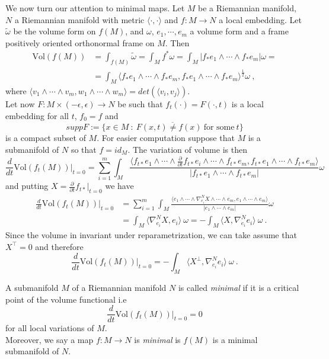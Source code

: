 We now turn our attention to minimal maps.
Let $M$ be a Riemannian manifold, $N$ a Riemannian manifold with metric $\langle \cdot, \cdot \rangle$ and $f:M \to N$ a local embedding. Let $\widetilde{\omega}$ be the volume form on $f(M)$, and $\omega$, $e_1, \cdots , e_m$ a volume form and a frame positively oriented orthonormal frame on $M$. Then
\[
\begin{split}
    \text{Vol}(f(M)) & = \int_{f(M)} \widetilde{\omega} = \int_M f^* \omega  = \int_M | f_* e_1 \wedge \cdots \wedge f_* e_m | \omega = \\
    & = \int_M \langle f_* e_1 \wedge \cdots \wedge f_* e_m ,f_* e_1 \wedge \cdots \wedge f_* e_m \rangle ^{\frac{1}{2}} \omega \ ,
\end{split}
\]
where $\langle v_1 \wedge \cdots \wedge v_m , w_1 \wedge \cdots \wedge w_m \rangle = det(\langle v_i,v_j \rangle)$.\\
Let now $F: M \times (-\epsilon, \epsilon) \to N$ be such that $f_t(\cdot) = F(\cdot,t)$ is a local embedding for all $t$, $f_0 = f$ and
\[ supp F:= \overline{ \{ x\in M \ :\ F(x,t) \neq f(x) \ \text{for some} \ t\} }  \]
is a compact subset of $M$. For easier computation suppose that $M$ is a submanifold of $N$ so that $f = id_M$. The variation of volume is then
\[
    \frac{d}{dt} \text{Vol}(f_t(M)) \Big|_{t=0} = \sum_{i=1}^m \int_M \frac{ \langle f_{t*} e_1 \wedge \cdots \wedge \frac{\partial}{\partial t} f_{t*} e_i \wedge \cdots \wedge f_{t*} e_m ,f_{t*} e_1 \wedge \cdots \wedge f_{t*} e_m \rangle }{| f_{t*} e_1 \wedge \cdots \wedge f_{t*} e_m |} \omega
\]
and putting $X =\frac{\partial}{\partial t} f_{t*} |_{t=0} $ we have
\[
\begin{split}
    \frac{d}{dt} \text{Vol}(f_t(M)) \Big|_{t=0} & = \sum_{i=1}^m \int_M \frac{ \langle e_1 \wedge \cdots \wedge \nabla^N_{e_i} X \wedge \cdots \wedge e_m , e_1 \wedge \cdots \wedge e_m \rangle }{| e_1 \wedge \cdots \wedge e_m |} \omega \\
    & = \int_M \langle \nabla^N_{e_i} X, e_i \rangle \ \omega = - \int_M \langle X, \nabla^N_{e_i} e_i \rangle \ \omega \ .
\end{split}
\]
Since the volume in invariant under reparametrization, we can take assume that $X^\top =0$ and therefore
\[
   \frac{d}{dt} \text{Vol}(f_t(M)) \Big|_{t=0}  = - \int_M \langle X^\perp, \nabla^N_{e_i} e_i \rangle \ \omega \ . 
\]
\begin{definition}
    A submanifold $M$ of a Riemannian manifold $N$ is called \textit{minimal} if it is a critical point of the volume functional i.e
    \[
        \frac{d}{dt} \text{Vol}(f_t(M)) \Big|_{t=0}  = 0
    \]
    for all local variations of $M$.\\
    Moreover, we say a map $f:M \to N$ is \textit{minimal} is $f(M)$ is a minimal submanifold of $N$.
\end{definition}
